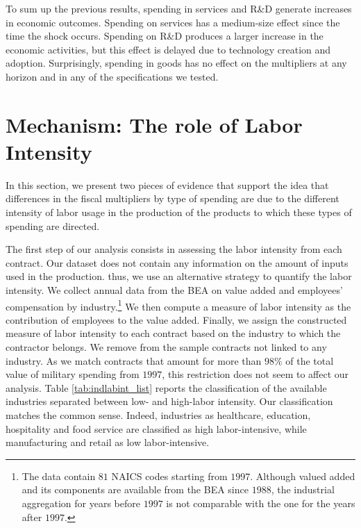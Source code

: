 \documentclass[dv_diss_main.tex]{subfiles}
\begin{document}
To sum up the previous results, spending in services and R\&D generate increases in economic outcomes. Spending on services has a medium-size effect since the time the shock occurs. Spending on R\&D produces a larger increase in the economic activities, but this effect is delayed due to technology creation and adoption. Surprisingly, spending in goods has no effect on the multipliers at any horizon and in any of the specifications we tested.








\section{Mechanism: The role of Labor Intensity}
\label{sec:lab_int}

In this section, we present two pieces of evidence that support the idea that differences in the fiscal multipliers by type of spending are due to the different intensity of labor usage in the production of the products to which these types of spending are directed.

The first step of our analysis consists in assessing the labor intensity from each contract. Our dataset does not contain any information on the amount of inputs used in the production. thus, we use an alternative strategy to quantify the labor intensity. We collect annual data from the BEA on value added and employees' compensation by industry.\footnote{The data contain $81$ NAICS codes starting from $1997$. Although valued added and its components are available from the BEA since $1988$, the industrial aggregation for years before $1997$ is not comparable with the one for the years after $1997$.} We then compute a measure of labor intensity as the contribution of employees to the value added. Finally, we assign the constructed measure of labor intensity to each contract based on the industry to which the contractor belongs. We remove from the sample contracts not linked to any industry. As we match contracts that amount for more than $98\%$ of the total value of military spending from $1997$, this restriction does not seem to affect our analysis. Table \ref{tab:indlabint_list} reports the classification of the available industries separated between low- and high-labor intensity. Our classification matches the common sense. Indeed, industries as healthcare, education, hospitality and food service are classified as high labor-intensive, while manufacturing and retail as low labor-intensive.
\end{document}
